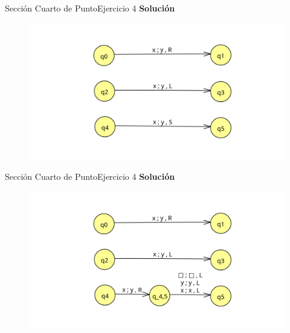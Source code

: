 \documentclass[10pt, envcountsect, presentation, aspectratio=169]{beamer}
\begin{document}

\begin{frame}{Sección Cuarto de Punto}{Ejercicio 4}
    \textbf{Solución}\\
    \begin{figure}
        \includegraphics[scale=0.15]{images/mct1ej4_1.png}
    \end{figure}
\end{frame}


\begin{frame}{Sección Cuarto de Punto}{Ejercicio 4}
    \textbf{Solución}\\
    \begin{figure}
        \includegraphics[scale=0.15]{images/mct1ej4_2.png}
    \end{figure}
\end{frame}


\end{document}
